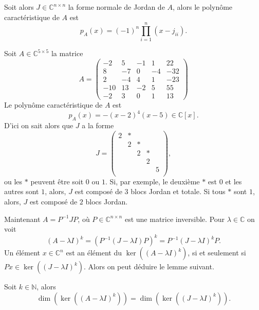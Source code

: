 \noindent 
Soit alors $J ∈ ℂ^{n ×n}$ la forme normale de Jordan de $A$, alors le polynôme caractéristique de $A$ est
\begin{equation}
  \label{eq:57}
  p_A(x) = (-1)^n ∏_{i=1}^n (x - j_{ii}). 
\end{equation}


\begin{example}
  \label{exe:52}

  Soit $A ∈ ℂ^{5 ×5}$ la matrice
  \begin{displaymath}
    A =  \left(\begin{array}{rrrrr}
-2 & 5 & -1 & 1 & 22 \\
8 & -7 & 0 & -4 & -32 \\
2 & -4 & 4 & 1 & -23 \\
-10 & 13 & -2 & 5 & 55 \\
-2 & 3 & 0 & 1 & 13
\end{array}\right)
\end{displaymath}
%
Le polynôme caractéristique de $A$ est
\begin{displaymath}
  p_A(x) = - (x-2)^4 (x-5) ∈ℂ[x]. 
\end{displaymath}
%
D'ici on sait alors que $J$ a la forme
\begin{displaymath}
  J =
  \begin{pmatrix}
    2 & *  \\
    & 2 & * \\
    & & 2 & * \\
    & & & 2   \\
    & & & & 5 \\
  \end{pmatrix}, 
\end{displaymath}
ou les $*$ peuvent être soit $0$ ou $1$. Si, par exemple, le deuxième $*$ est $0$ et les autres sont $1$, alors, $J$ est composé de $3$ blocs Jordan et totale. Si tous $*$ sont $1$, alors, $J$ est composé de $2$ blocs Jordan. 
\end{example}

Maintenant $A = P^{-1} J P$, où $P ∈ℂ^{n×n}$ est une matrice inversible.  Pour $λ ∈ ℂ$ on voit
\begin{displaymath}
  (A - λI)^k =  \left (P^{-1} (J - λ I) P \right)^k = P^{-1} (J - λ I)^k  P. 
\end{displaymath}
Un élément $x ∈ℂ^n$ est an élément du $\ker \left((A - λI)^k\right)$, si et seulement si $P x ∈ \ker \left((J - λI)^k\right)$. Alors on peut déduire le lemme suivant.
\begin{lemma}
  \label{lem:28}
  Soit $k ∈ ℕ$, alors
  \begin{displaymath}
     \dim(\ker \left((A - λI)^k \right)) = \dim(\ker \left((J- λI)^k \right)). 
  \end{displaymath}
\end{lemma}


